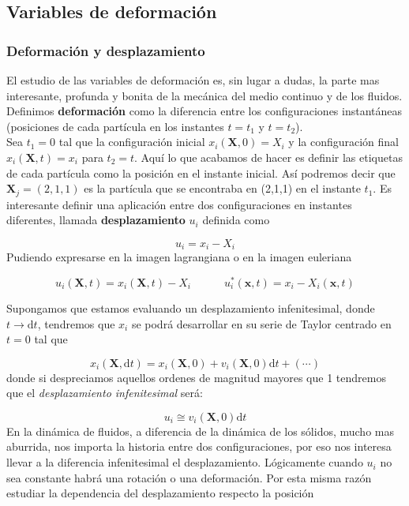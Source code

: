 \documentclass[12pt,a4paper]{article}
\numberwithin{equation}{section}
\numberwithin{figure}{section}
\newcommand{\D}{\mathrm{d}}
\newcommand{\tquad}{\quad \quad \quad}
\newcommand{\xn}{\mathbf{x}}
\newcommand{\Xn}{\mathbf{X}}
\begin{document}
\subsection{Variables de deformación}

\subsubsection{Deformación y desplazamiento}

El estudio de las variables de deformación es, sin lugar a dudas, la parte mas interesante, profunda y bonita de la mecánica del medio continuo y de los fluidos. Definimos \textbf{deformación} como la diferencia entre los configuraciones instantáneas (posiciones de cada partícula en los instantes $t=t_1$ y $t = t_2$). \\

Sea $t_1=0$ tal que la configuración inicial $x_i (\Xn,0)=X_i $ y la configuración final $x_i (\Xn,t)=x_i$ para $t_2=t$. Aquí lo que acabamos de hacer es definir las etiquetas de cada partícula como la posición en el instante inicial. Así podremos decir que $\Xn_j=(2,1,1)$ es la partícula que se encontraba en (2,1,1) en el instante $t_1$. Es interesante definir una aplicación entre dos configuraciones en instantes diferentes, llamada \textbf{desplazamiento} $u_i$ definida como

\begin{equation}
u_i = x_i - X_i 
\end{equation}
Pudiendo expresarse en la imagen lagrangiana o en la imagen euleriana

\begin{equation}
u_i (\Xn,t) = x_i (\Xn,t) - X_i \tquad u_i^* (\xn,t) = x_i - X_i (\xn,t) \label{Ec:3.3.1.013}
\end{equation}

Supongamos que estamos evaluando un desplazamiento infenitesimal, donde $t \longrightarrow \D t$, tendremos que $x_i$ se podrá desarrollar en su serie de Taylor centrado en $t=0$ tal que

\begin{equation}
x_i (\Xn,\D t ) = x_i (\Xn,0) + v_i (\Xn,0) \D t + (\cdots) 
\end{equation}
donde si despreciamos aquellos ordenes de magnitud mayores que 1 tendremos que el \textit{desplazamiento infenitesimal} será:

\begin{equation}
 u_i \cong v_i (\Xn,0) \D t \label{Ec:3.3.1.014}
\end{equation}
En la dinámica de fluidos, a diferencia de la dinámica de los sólidos, mucho mas aburrida, nos importa la historia entre dos configuraciones, por eso nos interesa llevar a la diferencia infenitesimal el desplazamiento. Lógicamente cuando $u_i$ no sea constante habrá una rotación o una deformación. Por esta misma razón estudiar la dependencia del desplazamiento respecto la posición 
\end{document}
